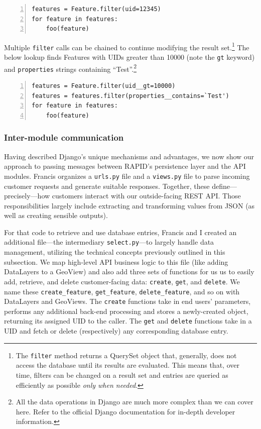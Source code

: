 \begin{Verbatim}[samepage=true,baselinestretch=1,numbers=left,xleftmargin=12mm]
features = Feature.filter(uid=12345)
for feature in features:
    foo(feature)
\end{Verbatim}

Multiple \texttt{filter} calls can be chained to continue modifying the result set.\footnote{The \texttt{filter} method returns a QuerySet object that, generally, does not access the database until its results are evaluated. This means that, over time, filters can be changed on a result set and entries are queried as efficiently as possible \textit{only when needed}.} The below lookup finds Features with UIDs greater than 10000 (note the \texttt{gt} keyword) and \texttt{properties} strings containing ``Test''.\footnote{All the data operations in Django are much more complex than we can cover here. Refer to the official Django documentation for in-depth developer information.}

\begin{Verbatim}[samepage=true,baselinestretch=1,numbers=left,xleftmargin=12mm]
features = Feature.filter(uid__gt=10000)
features = features.filter(properties__contains=`Test')
for feature in features:
    foo(feature)
\end{Verbatim}

\subsubsection{Inter-module communication}
Having described Django's unique mechanisms and advantages, we now show our approach to passing messages between RAPID's persistence layer and the API modules. Francis organizes a \texttt{urls.py} file and a \texttt{views.py} file to parse incoming customer requests and generate suitable responses. Together, these define---precisely---how customers interact with our outside-facing REST API. Those responsibilities largely include extracting and transforming values from JSON (as well as creating sensible outputs).

For that code to retrieve and use database entries, Francis and I created an additional file---the intermediary \texttt{select.py}---to largely handle data management, utilizing the technical concepts previously outlined in this subsection. We map high-level API business logic to this file (like adding DataLayers to a GeoView) and also add three sets of functions for us us to easily add, retrieve, and delete customer-facing data: \texttt{create}, \texttt{get}, and \texttt{delete}. We name these \texttt{create\_feature}, \texttt{get\_feature}, \texttt{delete\_feature}, and so on with DataLayers and GeoViews. The \texttt{create} functions take in end users' parameters, performs any additional back-end processing and stores a newly-created object, returning its assigned UID to the caller. The \texttt{get} and \texttt{delete} functions take in a UID and fetch or delete (respectively) any corresponding database entry.


